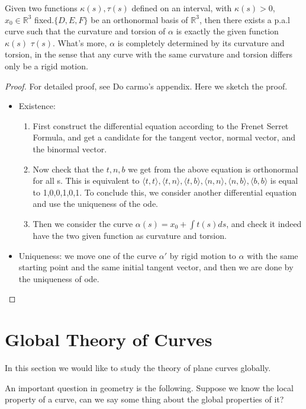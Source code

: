 \documentclass{article}
\begin{document}
\begin{theorem}
    Given two functions $\kappa(s), \tau(s)$ defined on an interval, with $\kappa(s)>0$, $x_0\in \mathbb{R}^3$ fixed.$\{D,E,F\}$ be an orthonormal basis of $\mathbb{R}^3$, then there exists a p.a.l curve such that the curvature and torsion of $\alpha$ is exactly the given function $\kappa(s)$  $\tau(s)$. What's more, $\alpha$ is completely determined by its curvature and torsion, in the sense that any curve with the same curvature and torsion differs only be a rigid motion.
\end{theorem}
\begin{proof}
    For detailed proof, see Do carmo's appendix. Here we sketch the proof.
    \begin{itemize}
        \item Existence:\begin{enumerate}
            \item First construct the differential equation according to the Frenet Serret Formula, and get a candidate for the tangent vector, normal vector, and the binormal vector.
            \item Now check that the $t,n,b$ we get from the above equation is orthonormal for all s. This is equivalent to $\langle t,t\rangle,\langle t,n\rangle,\langle t,b\rangle,\langle n,n\rangle, \langle n, b\rangle,\langle b,b\rangle$ is equal to 1,0,0,1,0,1. To  conclude this, we consider another differential equation and use the uniqueness of the ode.
            \item Then we consider the curve $\alpha(s)=x_0+\int t(s)ds$, and check it indeed have the two given function as curvature and torsion.
        \end{enumerate}
        \item Uniqueness: we move one of the curve $\alpha'$ by rigid motion to $\alpha$ with the same starting point and the same initial tangent vector, and then we are done by the uniqueness of ode.
    \end{itemize}
\end{proof}
\newpage
\section{Global Theory of Curves}
In this section we would like to study the theory of plane curves globally. 

An important question in geometry is the following. Suppose we know the local property of a curve, can we say some thing about the global properties of it?
\end{document}
